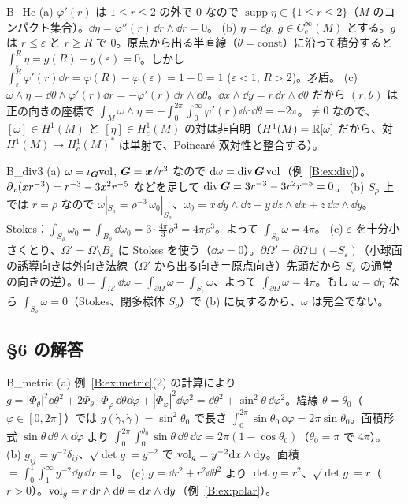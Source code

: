 \begin{soll}{B_Hc}
(a) $\varphi'(r)$ は $1\le r\le2$ の外で $0$ なので $\operatorname{supp}\eta\subset\{1\le r\le2\}$（$M$ のコンパクト集合）。$\dd\eta=\varphi''(r)\,\dd r\wedge\dd r=0$。
(b) $\eta=\dd g$, $g\in C^\infty_c(M)$ とする。$g$ は $r\le\varepsilon$ と $r\ge R$ で $0$。原点から出る半直線（$\theta=\text{const}$）に沿って積分すると $\int_\varepsilon^R\eta=g(R)-g(\varepsilon)=0$。しかし $\int_\varepsilon^R\varphi'(r)\dd r=\varphi(R)-\varphi(\varepsilon)=1-0=1$ ($\varepsilon<1$, $R>2$)。矛盾。
(c) $\omega\wedge\eta=\dd\theta\wedge\varphi'(r)\dd r=-\varphi'(r)\,\dd r\wedge\dd\theta$。$\dd x\wedge\dd y=r\,\dd r\wedge\dd\theta$ だから $(r,\theta)$ は正の向きの座標で $\int_M\omega\wedge\eta=-\int_0^{2\pi}\!\int_0^\infty\varphi'(r)\dd r\,\dd\theta=-2\pi$。$\ne0$ なので、$[\omega]\in H^1(M)$ と $[\eta]\in H^1_c(M)$ の対は非自明（$H^1(M)=\mathbb R[\omega]$ だから、対 $H^1(M)\to H^1_c(M)^*$ は単射で、Poincaré 双対性と整合する）。
\end{soll}

\begin{soll}{B_div3}
(a) $\omega=\iota_{\boldsymbol G}\mathrm{vol}$, $\boldsymbol G=\boldsymbol x/r^3$ なので $\mathrm{d}\omega=\operatorname{div}\boldsymbol G\,\mathrm{vol}$（例~\ref{B:ex:div}）。$\partial_x(xr^{-3})=r^{-3}-3x^2r^{-5}$ などを足して $\operatorname{div}\boldsymbol G=3r^{-3}-3r^{2}r^{-5}=0$。
(b) $S_\rho$ 上では $r=\rho$ なので $\omega|_{S_\rho}=\rho^{-3}\,\omega_0|_{S_\rho}$、$\omega_0=x\,\dd y\wedge\dd z+y\,\dd z\wedge\dd x+z\,\dd x\wedge\dd y$。Stokes：$\int_{S_\rho}\omega_0=\int_{B_\rho}\dd\omega_0=3\cdot\frac{4\pi}{3}\rho^3=4\pi\rho^3$。よって $\int_{S_\rho}\omega=4\pi$。
(c) $\varepsilon$ を十分小さくとり、$\Omega'=\Omega\setminus B_\varepsilon$ に Stokes を使う（$\dd\omega=0$）。$\partial\Omega'=\partial\Omega\sqcup(-S_\varepsilon)$（小球面の誘導向きは外向き法線（$\Omega'$ から出る向き＝原点向き）先頭だから $S_\varepsilon$ の通常の向きの逆）。$0=\int_{\Omega'}\dd\omega=\int_{\partial\Omega}\omega-\int_{S_\varepsilon}\omega$、よって $\int_{\partial\Omega}\omega=4\pi$。もし $\omega=\dd\eta$ なら $\int_{S_\rho}\omega=0$（Stokes、閉多様体 $S_\rho$）で (b) に反するから、$\omega$ は完全でない。
\end{soll}

\subsection*{§6 の解答}
\begin{soll}{B_metric}
(a) 例~\ref{B:ex:metric}(2) の計算により $g=|\Phi_\theta|^2\dd\theta^2+2\Phi_\theta\cdot\Phi_\varphi\,\dd\theta\dd\varphi+|\Phi_\varphi|^2\dd\varphi^2=\dd\theta^2+\sin^2\theta\,\dd\varphi^2$。緯線 $\theta=\theta_0$（$\varphi\in[0,2\pi]$）では $g(\dot\gamma,\dot\gamma)=\sin^2\theta_0$ で長さ $\int_0^{2\pi}\sin\theta_0\,\dd\varphi=2\pi\sin\theta_0$。面積形式 $\sin\theta\,\dd\theta\wedge\dd\varphi$ より $\int_0^{2\pi}\!\int_0^{\theta_0}\sin\theta\,\dd\theta\,\dd\varphi=2\pi(1-\cos\theta_0)$（$\theta_0=\pi$ で $4\pi$）。
(b) $g_{ij}=y^{-2}\delta_{ij}$、$\sqrt{\det g}=y^{-2}$ で $\mathrm{vol}_g=y^{-2}\mathrm{d} x\wedge\mathrm{d} y$。面積 $=\int_0^1\!\int_1^\infty y^{-2}\dd y\,\dd x=1$。
(c) $g=\dd r^2+r^2\dd\theta^2$ より $\det g=r^2$、$\sqrt{\det g}=r$（$r>0$）。$\mathrm{vol}_g=r\,\mathrm{d} r\wedge\mathrm{d}\theta=\mathrm{d} x\wedge\mathrm{d} y$（例~\ref{B:ex:polar}）。
\end{soll}


